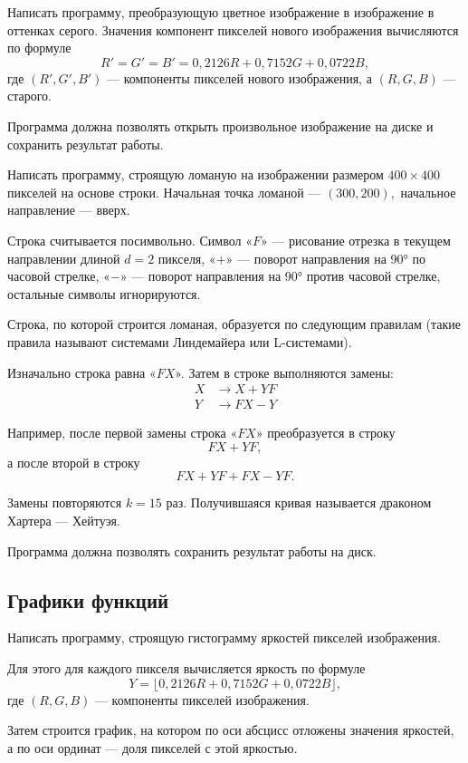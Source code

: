 \task Написать программу, преобразующую цветное изображение в
изображение в оттенках серого. Значения компонент пикселей нового изображения
вычисляются по формуле
\[
R' = G' = B' = 0{,}2126 R + 0{,}7152 G + 0{,}0722 B,
\]
где $(R',G',B')$ — компоненты пикселей нового изображения, а $(R,G,B)$
— старого.

Программа должна позволять открыть произвольное изображение на диске и
сохранить результат работы.

\task Написать программу, строящую ломаную на изображении размером
$400 \times 400$ пикселей на основе строки. Начальная точка ломаной —
$(300, 200),$ начальное направление — вверх.

Строка считывается посимвольно. Символ «$F$» — рисование отрезка в
текущем направлении длиной $d=2$ пикселя, «$+$» — поворот направления на
90° по часовой стрелке, «$-$» — поворот направления на 90° против
часовой стрелке, остальные символы игнорируются.

Строка, по которой строится ломаная, образуется по следующим правилам
(такие правила называют системами Линдемайера или L-системами).

Изначально строка равна «$FX$». Затем в строке выполняются замены:
\[
\begin{aligned}
  X &\to X+YF\\
  Y &\to FX-Y
\end{aligned}
\]

Например, после первой замены строка «$FX$» преобразуется в строку
\[
FX+YF,
\]
а после второй в строку
\[
FX+YF+FX-YF.
\]

Замены повторяются $k = 15$ раз. Получившаяся кривая называется
драконом Хартера — Хейтуэя.

Программа должна позволять сохранить результат работы на диск.


\subsection{Графики функций}

\task Написать программу, строящую гистограмму яркостей пикселей
изображения.

Для этого для каждого пикселя вычисляется яркость по формуле
\[
Y = \lfloor 0{,}2126 R + 0{,}7152 G + 0{,}0722 B \rfloor,
\]
где $(R,G,B)$ — компоненты пикселей изображения.

Затем строится график, на котором по оси абсцисс отложены значения
яркостей, а по оси ординат — доля пикселей с этой яркостью.

